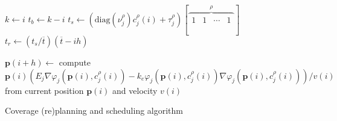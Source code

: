 \begin{algorithm}[h!]
{    {\normalsize $k\gets i$}\;\label{algo:repla:initbat}
    {\normalsize $t_b\gets k-i$}\;\label{algo:repla:endbat}%
    {\normalsize $t_s\gets(\mathrm{diag}(\nu_j^\rho)c_j^\rho(i)+\tau_j^\rho)[\overbrace{\begin{matrix}1&1&\cdots&1\end{matrix}}^{\rho}]$}\;\label{algo:repla:configtime}%
    {\normalsize $t_r\gets(t_s/\overline{t})(\overline{t}-ih)$}\label{algo:repla:loosingmyreligiontime}\;%
    \vspace{.8ex}
    
    {\normalsize $\mathbf{p}(i+h)\gets${ \otherfont compute }$\mathbf{p}(i)\left(E_j\nabla\varphi_j(\mathbf{p}(i),c_j^\rho(i))-k_e\varphi_j(\mathbf{p}(i),c_j^\rho(i))\nabla\varphi_j(\mathbf{p}(i),c_j^\rho(i))\right)/v(i)${ \otherfont \hspace*{1em}from current position }$\mathbf{p}(i)${ \otherfont and velocity }\normalfont $v(i)$}\;\label{algo:repla:gvf}
  }
  \vspace{.8ex}

  \caption{Coverage (re)planning and scheduling algorithm}
  \label{algo:repla}
\end{algorithm}

